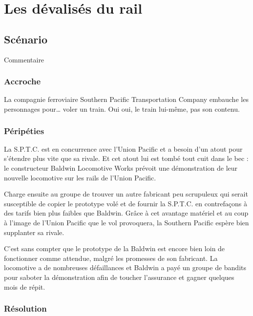 \chapter{Les dévalisés du rail}

\section{Scénario}

Commentaire

\subsection{Accroche}

La compagnie ferroviaire Southern Pacific Transportation Company embauche les personnages pour… voler un train. Oui oui, le train lui-même, pas son contenu.

\subsection{Péripéties}

 La S.P.T.C. est en concurrence avec l'Union Pacific et a besoin d'un atout pour s'étendre plus vite que sa rivale. Et cet atout lui est tombé tout cuit dans le bec : le constructeur Baldwin Locomotive Works prévoit une démonstration de leur nouvelle locomotive sur les rails de l'Union Pacific.

Charge ensuite au groupe de trouver un autre fabricant peu scrupuleux qui serait susceptible de copier le prototype volé et de fournir la S.P.T.C. en contrefaçons à des tarifs bien plus faibles que Baldwin. Grâce à cet avantage matériel et au coup à l'image de l'Union Pacific que le vol provoquera, la Southern Pacific espère bien supplanter sa rivale.

C'est sans compter que le prototype de la Baldwin est encore bien loin de fonctionner comme attendue, malgré les promesses de son fabricant. La locomotive a de nombreuses défaillances et Baldwin a payé un groupe de bandits pour saboter la démonstration afin de toucher l'assurance et gagner quelques mois de répit.

\subsection{Résolution}

